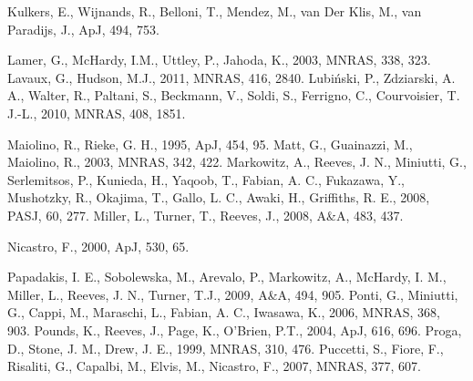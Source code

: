 \documentclass[useAMS,usenatbib]{sam}
\begin{document}
\begin{thebibliography}{99}
     Kulkers, E., Wijnands, R., Belloni, T., Mendez, M., van Der Klis, M., van Paradijs, J., ApJ, 494,
753.
    
     Lamer, G., McHardy, I.M., Uttley, P., Jahoda, K., 2003, MNRAS, 338, 323.
     Lavaux, G., Hudson, M.J., 2011, MNRAS, 416, 2840.
     Lubi\'{n}ski, P., Zdziarski, A. A., Walter, R., Paltani, S., Beckmann, V., Soldi, S.,
Ferrigno, C., Courvoisier, T. J.-L., 2010, MNRAS, 408, 1851.

     Maiolino, R., Rieke, G. H., 1995, ApJ, 454, 95.
     Matt, G., Guainazzi, M., Maiolino, R., 2003, MNRAS, 342, 422.
     Markowitz, A., Reeves, J. N., Miniutti, G., Serlemitsos, P., Kunieda, H., Yaqoob, T., Fabian, A.
C., Fukazawa, Y., Mushotzky, R., Okajima, T., Gallo, L. C., Awaki, H., Griffiths, R. E., 2008, PASJ, 60, 277.
     Miller, L., Turner, T., Reeves, J., 2008, A\&A, 483, 437.
    
    
     Nicastro, F., 2000, ApJ, 530, 65.
    
     Papadakis, I. E., Sobolewska,  M., Arevalo,  P., Markowitz, A., McHardy, I. M., Miller,  L.,
Reeves, J. N., 
    Turner, T.J., 2009, A\&A, 494, 905.
     Ponti, G., Miniutti, G., Cappi, M., Maraschi, L., Fabian, A. C., Iwasawa, K., 2006, MNRAS, 368, 903.
     Pounds, K., Reeves, J., Page, K., O'Brien, P.T., 2004, ApJ, 616, 696.
     Proga, D., Stone, J. M., Drew, J. E., 1999, MNRAS, 310, 476.
     Puccetti, S., Fiore, F., Risaliti, G., Capalbi, M., Elvis, M., Nicastro, F., 2007, MNRAS, 377, 607.
    


\end{thebibliography}
\end{document}
